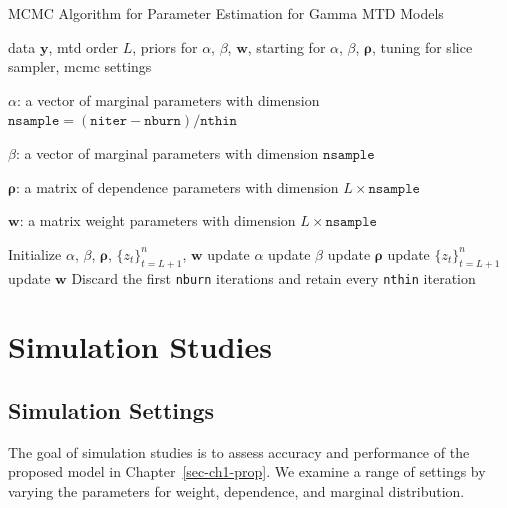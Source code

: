 \documentclass[
  letterpaper,
  double,
  12pt,
  1.0in]{beavtex}
\begin{document}
\begin{algorithm}
\caption{MCMC Algorithm for Parameter Estimation for Gamma MTD Models}
\label{alg:mcmc}
\begin{algorithmic}

\Require data $\boldsymbol{y}$, mtd order $L$, priors for $\alpha$, $\beta$, $\boldsymbol{w}$, starting for $\alpha$, $\beta$, $\boldsymbol{\rho}$, tuning for slice sampler, mcmc settings

\Ensure 
\State $\alpha$: a vector of marginal parameters with dimension $\texttt{nsample} =(\texttt{niter} - \texttt{nburn}) / \texttt{nthin}$

\State $\beta$: a vector of marginal parameters with dimension $\texttt{nsample}$

\State $\boldsymbol{\rho}$: a matrix of dependence parameters with dimension $L \times \texttt{nsample}$

\State $\boldsymbol{w}$: a matrix weight parameters with dimension $L \times \texttt{nsample}$

\State Initialize $\alpha$, $\beta$, $\boldsymbol{\rho}$, ${\{z_t\}}_{t=L+1}^n$, $\boldsymbol{w}$
    \State update $\alpha$ 
    \State update $\beta$ 
    \State update $\boldsymbol{\rho}$ 
    \State update ${\{z_t\}}_{t=L+1}^n$ 
    \State update $\boldsymbol{w}$ 
\EndFor
\State Discard the first 
\texttt{nburn}
iterations and retain every 
\texttt{nthin} iteration 
\end{algorithmic}
\end{algorithm}

\chapter{Simulation Studies}\label{sec-ch1-simu}

\section{Simulation Settings}\label{simulation-settings}

The goal of simulation studies is to assess accuracy and performance of
the proposed model in Chapter~\ref{sec-ch1-prop}. We examine a range of
settings by varying the parameters for weight, dependence, and marginal
distribution.
\end{document}
